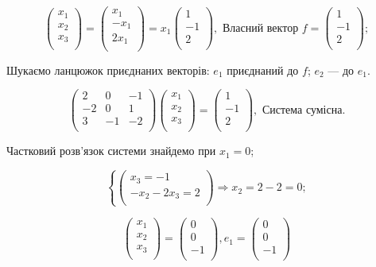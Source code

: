 $$\begin{pmatrix}
	x_1 \\
	x_2 \\
	x_3 \\
\end{pmatrix} = \begin{pmatrix}
	x_1 \\
	-x_1 \\
	2x_1 \\
\end{pmatrix} = x_1 \begin{pmatrix}
	1 \\
	-1 \\
	2 \\
\end{pmatrix}, \text{ Власний вектор } f = \begin{pmatrix}
	1 \\
	-1 \\
	2 \\
\end{pmatrix};$$

Шукаємо ланцюжок приєднаних векторів: $e_1$ приєднаний до $f$; $e_2$ --- до $e_1$.

$$\begin{pmatrix}
	2  & 0  & -1 \\
	-2 & 0  & 1  \\
	3  & -1 & -2 \\
\end{pmatrix} \begin{pmatrix}
	x_1 \\
	x_2 \\
	x_3 \\
\end{pmatrix} = \begin{pmatrix}
	1 \\
	-1 \\
	2 \\
\end{pmatrix}, \text{ Система сумісна}.$$

Частковий розв’язок системи знайдемо при $x_1 = 0$;

$$\left\{ \begin{pmatrix}
	x_3 = -1 \\
	-x_2 - 2 x_3 = 2 \\
\end{pmatrix} \right. \Rightarrow x_2 = 2 - 2 = 0; $$

$$\begin{pmatrix}
	x_1 \\
	x_2 \\
	x_3 \\
\end{pmatrix} = \begin{pmatrix}
	0 \\
	0 \\
	-1 \\
\end{pmatrix},  e_1 = \begin{pmatrix}
	0 \\
	0 \\
	-1 \\
\end{pmatrix} $$

